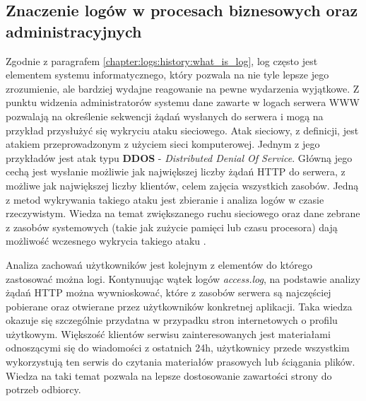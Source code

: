     \subsection{Znaczenie logów w procesach biznesowych oraz administracyjnych}
    Zgodnie z paragrafem \ref{chapter:logs:history:what_is_log}, log często jest elementem systemu informatycznego, 
    który pozwala na nie tyle lepsze jego zrozumienie, ale bardziej wydajne reagowanie na pewne wydarzenia wyjątkowe.
    Z punktu widzenia administratorów systemu dane zawarte w logach serwera WWW pozwalają na określenie 
    sekwencji żądań wysłanych do serwera i mogą na przykład przysłużyć się wykryciu ataku sieciowego.
    Atak sieciowy, z definicji, jest atakiem przeprowadzonym z użyciem sieci komputerowej.
    Jednym z jego przykładów jest atak typu \textbf{DDOS} - \textit{Distributed Denial Of Service}. 
    Główną jego cechą jest wysłanie możliwie jak największej liczby żądań HTTP do serwera, z możliwe jak największej liczby klientów,
    celem zajęcia wszystkich zasobów. Jedną z metod wykrywania takiego ataku jest zbieranie i analiza logów
    w czasie rzeczywistym. Wiedza na temat zwiększanego ruchu sieciowego oraz dane zebrane z zasobów systemowych (takie jak zużycie pamięci lub czasu procesora)
    dają możliwość wczesnego wykrycia takiego ataku \cite{web_based_attacks}.
    
    Analiza zachowań użytkowników jest kolejnym z elementów do którego zastosować można logi.
    Kontynuując wątek logów \textit{access.log}, na podstawie analizy żądań HTTP można wywnioskować, które z zasobów 
    serwera są najczęściej pobierane oraz otwierane przez użytkowników konkretnej aplikacji. Taka wiedza okazuje się szczególnie
    przydatna w przypadku stron internetowych o profilu użytkowym.
    Większość klientów serwisu zainteresowanych jest materiałami odnoszącymi się do wiadomości z ostatnich 24h,
    użytkownicy przede wszystkim wykorzystują ten serwis do czytania materiałów prasowych lub ściągania plików.
    Wiedza na taki temat pozwala na lepsze dostosowanie zawartości strony do potrzeb odbiorcy.
    